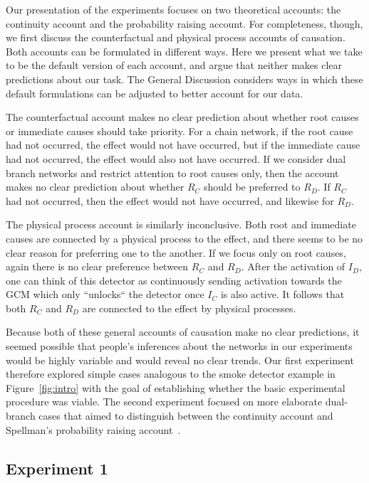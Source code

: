 \documentclass[10pt,letterpaper]{article}
\newcommand{\ev}[2]{$#1_#2$}
\begin{document}
Our presentation of the experiments focuses on two theoretical accounts: the continuity account and the probability raising account. For completeness, though, we first discuss the counterfactual and physical process accounts of causation.  Both accounts can be formulated in different ways. Here we present what we take to be the default version of each account, and argue that neither makes clear predictions about our task. The General Discussion considers ways in which these default formulations can be adjusted to better account for our data.

The counterfactual account makes no clear prediction about whether root causes or immediate causes should take priority. For a chain network, if the root cause had not occurred, the effect would not have occurred, but if the immediate cause had not occurred, the effect would also not have occurred. If we consider dual branch networks and restrict attention to root causes only, then the account makes no clear prediction about whether \ev{R}{C} should be preferred to \ev{R}{D}.  If \ev{R}{C} had not occurred, then the effect would not have occurred, and likewise for \ev{R}{D}.  

The physical process account is similarly inconclusive. Both root and immediate causes are connected by a physical process to the effect, and there seems to be no clear reason for preferring one to the another. If we focus only on root causes, again there is no clear preference between \ev{R}{C} and \ev{R}{D}. After the activation of \ev{I}{D}, one can think of this detector as continuously sending activation towards the GCM which only ``unlocks`` the detector once \ev{I}{C} is also active. It follows that both \ev{R}{C} and \ev{R}{D} are connected to the effect by physical processes.

Because both of these general accounts of causation make no clear predictions, it seemed possible that people's inferences about the networks in our experiments would be highly variable and would reveal no clear trends. Our first experiment therefore explored simple cases analogous to the smoke detector example in Figure~\ref{fig:intro} with the goal of establishing whether the basic experimental procedure was viable.  The second experiment focused on more elaborate dual-branch cases that aimed to distinguish between the continuity account and Spellman's probability raising account~\cite{spellman97}.

\subsection{Experiment 1}
\end{document}
